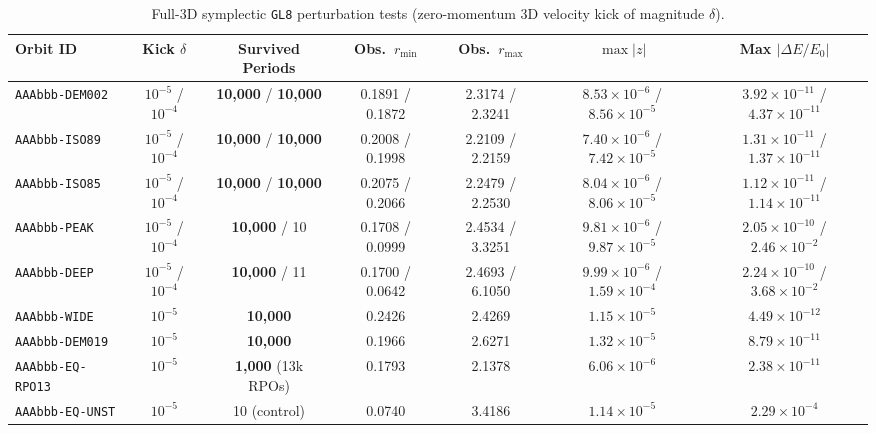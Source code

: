 \documentclass[11pt,a4paper]{article}
\begin{document}
\begin{table}[t]
  \centering
  \footnotesize
  \begin{tabular}{@{}lcccccc@{}}
    \toprule
    Orbit ID & Kick $\delta$ & Survived Periods & Obs.\ $r_{\min}$ & Obs.\ $r_{\max}$ & $\max |z|$ & Max $|\Delta E / E_0|$ \\
    \midrule
    \texttt{AAAbbb-DEM002} & $10^{-5}$ / $10^{-4}$ & \textbf{10,000} / \textbf{10,000} & 0.1891 / 0.1872 & 2.3174 / 2.3241 & $8.53\times10^{-6}$ / $8.56\times10^{-5}$ & $3.92\times10^{-11}$ / $4.37\times10^{-11}$ \\
    \texttt{AAAbbb-ISO89}  & $10^{-5}$ / $10^{-4}$ & \textbf{10,000} / \textbf{10,000} & 0.2008 / 0.1998 & 2.2109 / 2.2159 & $7.40\times10^{-6}$ / $7.42\times10^{-5}$ & $1.31\times10^{-11}$ / $1.37\times10^{-11}$ \\
    \texttt{AAAbbb-ISO85}  & $10^{-5}$ / $10^{-4}$ & \textbf{10,000} / \textbf{10,000} & 0.2075 / 0.2066 & 2.2479 / 2.2530 & $8.04\times10^{-6}$ / $8.06\times10^{-5}$ & $1.12\times10^{-11}$ / $1.14\times10^{-11}$ \\
    \texttt{AAAbbb-PEAK}   & $10^{-5}$ / $10^{-4}$ & \textbf{10,000} / 10 & 0.1708 / 0.0999 & 2.4534 / 3.3251 & $9.81\times10^{-6}$ / $9.87\times10^{-5}$ & $2.05\times10^{-10}$ / $2.46\times10^{-2}$ \\
    \texttt{AAAbbb-DEEP}   & $10^{-5}$ / $10^{-4}$ & \textbf{10,000} / 11 & 0.1700 / 0.0642 & 2.4693 / 6.1050 & $9.99\times10^{-6}$ / $1.59\times10^{-4}$ & $2.24\times10^{-10}$ / $3.68\times10^{-2}$ \\
    \texttt{AAAbbb-WIDE}   & $10^{-5}$ & \textbf{10,000} & 0.2426 & 2.4269 & $1.15\times10^{-5}$ & $4.49\times10^{-12}$ \\
    \texttt{AAAbbb-DEM019} & $10^{-5}$ & \textbf{10,000} & 0.1966 & 2.6271 & $1.32\times10^{-5}$ & $8.79\times10^{-11}$ \\
    \texttt{AAAbbb-EQ-RPO13}& $10^{-5}$ & \textbf{1,000} (13k RPOs) & 0.1793 & 2.1378 & $6.06\times10^{-6}$ & $2.38\times10^{-11}$ \\
    \texttt{AAAbbb-EQ-UNST}& $10^{-5}$ & 10 (control) & 0.0740 & 3.4186 & $1.14\times10^{-5}$ & $2.29\times10^{-4}$ \\
    \bottomrule
  \end{tabular}
  \caption{Full-3D symplectic \texttt{GL8} perturbation tests (zero-momentum 3D velocity kick of magnitude $\delta$).}
  \label{tab:lt}
\end{table}
\end{document}
